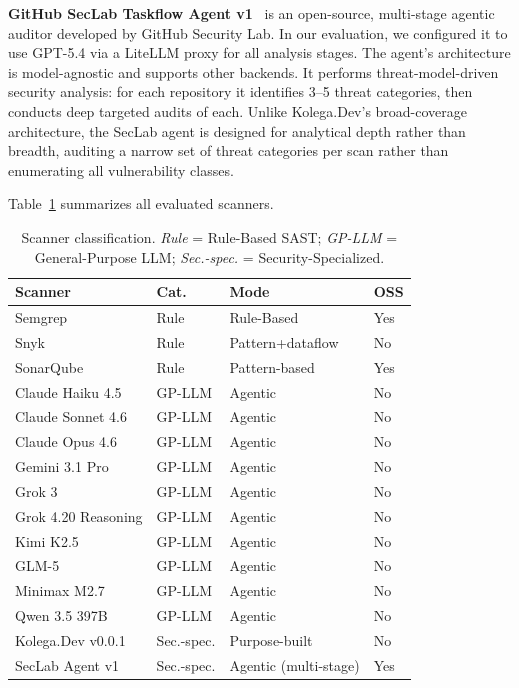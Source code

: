 \textbf{GitHub SecLab Taskflow Agent v1}~\cite{seclab-taskflow} is an open-source, multi-stage agentic auditor developed by GitHub Security Lab. In our evaluation, we configured it to use GPT-5.4 via a LiteLLM proxy for all analysis stages. The agent's architecture is model-agnostic and supports other backends. It performs threat-model-driven security analysis: for each repository it identifies 3--5 threat categories, then conducts deep targeted audits of each. Unlike Kolega.Dev's broad-coverage architecture, the SecLab agent is designed for analytical depth rather than breadth, auditing a narrow set of threat categories per scan rather than enumerating all vulnerability classes.

\medskip
\noindent
Table~\ref{tab:scanners} summarizes all evaluated scanners.

\begin{table}[t]
  \caption{Scanner classification. \emph{Rule} = Rule-Based SAST;
    \emph{GP-LLM} = General-Purpose LLM; \emph{Sec.-spec.} = Security-Specialized.}
  \label{tab:scanners}
  \centering
  \footnotesize
  \begin{tabular}{@{}llll@{}}
    \toprule
    \textbf{Scanner} & \textbf{Cat.} & \textbf{Mode} & \textbf{OSS} \\
    \midrule
    Semgrep          & Rule  & Rule-Based         & Yes \\
    Snyk             & Rule  & Pattern+dataflow   & No  \\
    SonarQube        & Rule  & Pattern-based      & Yes \\
    \midrule
    Claude Haiku 4.5    & GP-LLM & Agentic       & No \\
    Claude Sonnet 4.6   & GP-LLM & Agentic       & No \\
    Claude Opus 4.6     & GP-LLM & Agentic       & No \\
    Gemini 3.1 Pro      & GP-LLM & Agentic       & No \\
    Grok 3              & GP-LLM & Agentic       & No \\
    Grok 4.20 Reasoning & GP-LLM & Agentic       & No \\
    Kimi K2.5           & GP-LLM & Agentic       & No \\
    GLM-5               & GP-LLM & Agentic       & No \\
    Minimax M2.7        & GP-LLM & Agentic       & No \\
    Qwen 3.5 397B       & GP-LLM & Agentic       & No \\
    \midrule
    Kolega.Dev v0.0.1  & Sec.-spec. & Purpose-built & No \\
    SecLab Agent v1 & Sec.-spec. & Agentic (multi-stage) & Yes \\
    \bottomrule
  \end{tabular}
\end{table}

